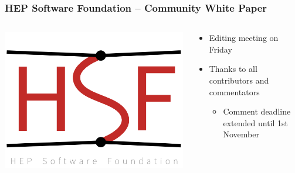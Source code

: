\maketitle

\begin{frame}
  \frametitle{HEP Software Foundation -- Community White Paper}
  \begin{columns}
    \begin{column}{.3\textwidth}
      \includegraphics[width=\textwidth]{./hsf_logo_angled.png}
    \end{column}
    \begin{column}{.7\textwidth}
      \begin{itemize}
        \item Editing meeting on Friday
        \item Thanks to all contributors and commentators
          \begin{itemize}
            \item Comment deadline extended until 1st November
          \end{itemize}
      \end{itemize}
    \end{column}
  \end{columns}
\end{frame}

